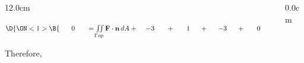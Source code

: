 \begin{frame}
\begin{columns}
\begin{column}{12.0cm}
%

\vspace{0.4cm}

$\D{
\ON<1>{\B{\hspace{0.6cm} 0 \hspace{0.6cm} = \iint \limits_{Top} {\bf F} \cdot {\bf n}\, dA + \hspace{0.4cm} -3 \hspace{0.6cm} + \hspace{0.6cm} 1 \hspace{0.5cm} + \hspace{0.5cm} -3 \hspace{0.5cm} + \hspace{0.6cm} 0 \hspace{0.6cm} + \hspace{0.6cm} 0 }}}$

\vspace{0.2cm}

Therefore, 

\end{column}\begin{column}{0.0cm}\end{column}\end{columns}
\end{frame}
